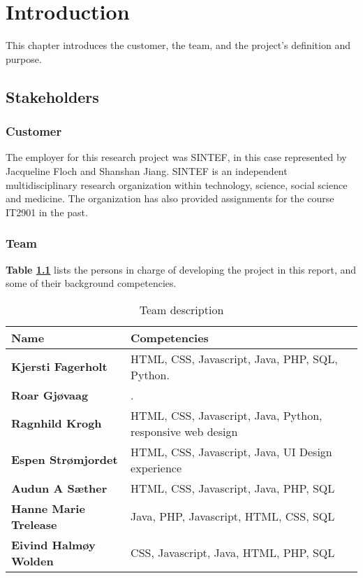 
\chapter{Introduction}

This chapter introduces the customer, the team, and the project's definition and purpose.

\section{Stakeholders}

\subsection{Customer}

The employer for this research project was SINTEF, in this case represented by Jacqueline Floch and Shanshan Jiang. SINTEF is an independent multidisciplinary research organization within technology, science, social science and medicine. The organization has also provided assignments for the course IT2901 in the past.

\subsection{Team}

\textbf{Table \ref{Tab:team}} lists the persons in charge of developing the project in this report, and some of their background competencies.

\begin{table}[!h]
	\begin{center}
		\caption{Team description}
		\label{Tab:team}
		\begin{tabular}{  l  l }
			\textbf{Name} & \textbf{Competencies} \\ \hline
			\textbf{Kjersti Fagerholt} & HTML, CSS, Javascript, Java, PHP, SQL, Python. \\ 
			\textbf{Roar Gjøvaag} & . \\ 
			\textbf{Ragnhild Krogh} & HTML, CSS, Javascript, Java, Python, responsive web design \\ 
			\textbf{Espen Strømjordet} & HTML, CSS, Javascript, Java,
			UI Design experience \\ 
			\textbf{Audun A Sæther} & HTML, CSS, Javascript, Java, PHP, SQL \\ 
			\textbf{Hanne Marie Trelease} & Java, PHP, Javascript, HTML, CSS, SQL \\ 
			\textbf{Eivind Halmøy Wolden} & CSS, Javascript, Java, HTML, PHP, SQL \\ 
		\end{tabular}
	\end{center}
\end{table}

